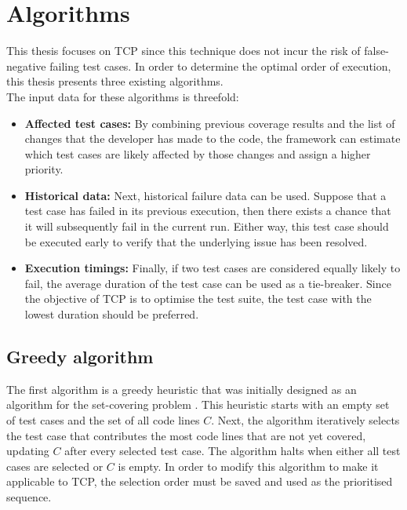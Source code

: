 \section{Algorithms}
\noindent This thesis focuses on TCP since this technique does not incur the risk of false-negative failing test cases. In order to determine the optimal order of execution, this thesis presents three existing algorithms.\\

\noindent The input data for these algorithms is threefold:\\

\begin{itemize}
\item \textbf{Affected test cases:} By combining previous coverage results and the list of changes that the developer has made to the code, the framework can estimate which test cases are likely affected by those changes and assign a higher priority.

\item \textbf{Historical data:} Next, historical failure data can be used. Suppose that a test case has failed in its previous execution, then there exists a chance that it will subsequently fail in the current run. Either way, this test case should be executed early to verify that the underlying issue has been resolved.

\item \textbf{Execution timings:} Finally, if two test cases are considered equally likely to fail, the average duration of the test case can be used as a tie-breaker. Since the objective of TCP is to optimise the test suite, the test case with the lowest duration should be preferred.
\end{itemize}

\subsection{Greedy algorithm}
\noindent The first algorithm is a greedy heuristic that was initially designed as an algorithm for the set-covering problem \cite{evaluationoftestsuiteminimization}. This heuristic starts with an empty set of test cases and the set of all code lines $C$. Next, the algorithm iteratively selects the test case that contributes the most code lines that are not yet covered, updating $C$ after every selected test case. The algorithm halts when either all test cases are selected or $C$ is empty. In order to modify this algorithm to make it applicable to TCP, the selection order must be saved and used as the prioritised sequence.

